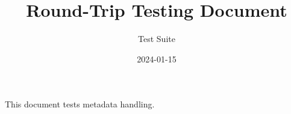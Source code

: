 \documentclass{article}
\title{Round-Trip Testing Document}
\author{Test Suite}
\date{2024-01-15}
\begin{document}
\maketitle

This document tests metadata handling.
\end{document}
